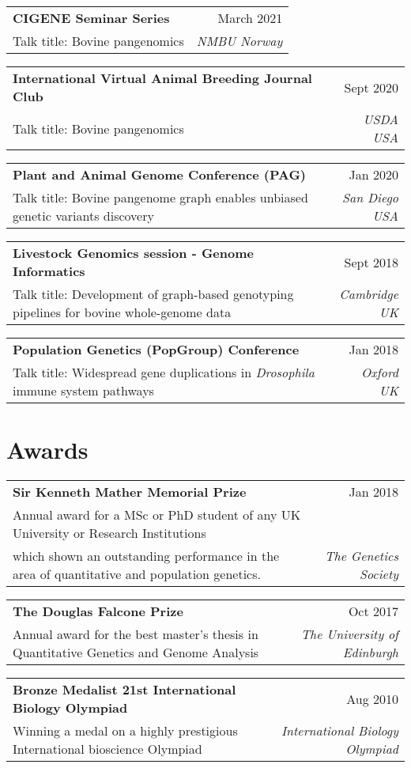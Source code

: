 \documentclass[letterpaper,10pt]{article}
\makeatletter
\newcommand{\resumetalk}[4]{\small{
  \vspace{-2pt}\item
    \begin{tabular*}{0.97\textwidth}[t]{l@{\extracolsep{\fill}}r}
      \textbf{#1} & #2 \\
      \small#3 & \textit{\small #4} \\
    \end{tabular*}\vspace{-7pt}
    }
}
\newcommand{\resumeSubHeadingListStart}{\begin{itemize}[leftmargin=0.15in, label={}]}
\newcommand{\resumeSubHeadingListEnd}{\end{itemize}}
\makeatother
\begin{document}
 \resumeSubHeadingListStart
 \small{
 
    \resumetalk {CIGENE Seminar Series}{March 2021}
      {Talk title: Bovine pangenomics}{NMBU Norway}
      \resumetalk {International Virtual Animal Breeding Journal Club}{Sept 2020}
      {Talk title: Bovine pangenomics}{USDA USA}
   \resumetalk {Plant and Animal Genome Conference (PAG)}{Jan 2020}
      {Talk title: Bovine pangenome graph enables unbiased genetic variants discovery}{San Diego USA}
      
  \resumetalk {Livestock Genomics session - Genome Informatics}{Sept 2018}
     {Talk title: Development of graph-based genotyping pipelines for bovine whole-genome data}{Cambridge UK}
     
    \resumetalk {Population Genetics (PopGroup) Conference }{Jan 2018}
     {Talk title: Widespread gene duplications in \textit{Drosophila} immune system pathways}{Oxford UK}
     
      
    }
\resumeSubHeadingListEnd
    
\section{Awards}
   
 \resumeSubHeadingListStart
 \small{
 
    \resumetalk {Sir Kenneth Mather Memorial Prize}{Jan 2018}
      {Annual award for a MSc or PhD student of any UK University or Research Institutions \\ which shown an outstanding performance in the area of quantitative and population genetics. }{The Genetics Society}
    \resumetalk {The Douglas Falcone Prize }{Oct 2017}
      {Annual award for the best master’s thesis in Quantitative Genetics and Genome Analysis}{The University of Edinburgh}
   \resumetalk {Bronze Medalist 21st International Biology Olympiad}{Aug 2010}
      {Winning a medal on a highly prestigious International bioscience Olympiad}{International Biology Olympiad}
     
      
    }
\resumeSubHeadingListEnd


\end{document}
